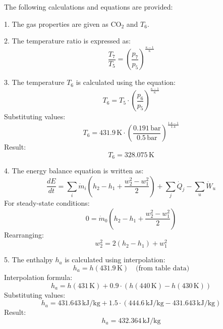 The following calculations and equations are provided:  

1. The gas properties are given as \( \text{CO}_2 \) and \( T_6 \).  

2. The temperature ratio is expressed as:  
\[
\frac{T_7}{T_5} = \left( \frac{p_7}{p_5} \right)^{\frac{\kappa - 1}{\kappa}}
\]  

3. The temperature \( T_6 \) is calculated using the equation:  
\[
T_6 = T_5 \cdot \left( \frac{p_6}{p_5} \right)^{\frac{\kappa - 1}{\kappa}}
\]  
Substituting values:  
\[
T_6 = 431.9 \, \text{K} \cdot \left( \frac{0.191 \, \text{bar}}{0.5 \, \text{bar}} \right)^{\frac{1.4 - 1}{1.4}}
\]  
Result:  
\[
T_6 = 328.075 \, \text{K}
\]  

4. The energy balance equation is written as:  
\[
\frac{dE}{dt} = \sum_i \dot{m}_i \left( h_2 - h_1 + \frac{w_2^2 - w_1^2}{2} \right) + \sum_j \dot{Q}_j - \sum_u \dot{W}_u
\]  
For steady-state conditions:  
\[
0 = \dot{m}_0 \left( h_2 - h_1 + \frac{w_2^2 - w_1^2}{2} \right)
\]  
Rearranging:  
\[
w_2^2 = 2 \left( h_2 - h_1 \right) + w_1^2
\]  

5. The enthalpy \( h_a \) is calculated using interpolation:  
\[
h_a = h \left( 431.9 \, \text{K} \right) \quad \text{(from table data)}  
\]  
Interpolation formula:  
\[
h_a = h \left( 431 \, \text{K} \right) + 0.9 \cdot \left( h \left( 440 \, \text{K} \right) - h \left( 430 \, \text{K} \right) \right)
\]  
Substituting values:  
\[
h_a = 431.643 \, \text{kJ/kg} + 1.5 \cdot \left( 444.6 \, \text{kJ/kg} - 431.643 \, \text{kJ/kg} \right)
\]  
Result:  
\[
h_a = 432.364 \, \text{kJ/kg}
\]